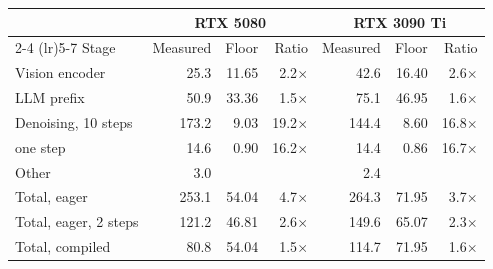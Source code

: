 \centering
\small
\begin{tabular}{lrrrrrr}
\toprule
 & \multicolumn{3}{c}{RTX 5080} & \multicolumn{3}{c}{RTX 3090 Ti} \\
\cmidrule(lr){2-4} \cmidrule(lr){5-7}
Stage & Measured & Floor & Ratio & Measured & Floor & Ratio \\
\midrule
Vision encoder          & 25.3  & 11.65 & 2.2$\times$  & 42.6 & 16.40 & 2.6$\times$ \\
LLM prefix              & 50.9  & 33.36 & 1.5$\times$  & 75.1 & 46.95 & 1.6$\times$ \\
Denoising, 10 steps     & 173.2 & 9.03  & 19.2$\times$ & 144.4 & 8.60  & 16.8$\times$ \\
\quad one step          & 14.6  & 0.90  & 16.2$\times$ & 14.4 & 0.86  & 16.7$\times$ \\
Other                   & 3.0   &       &              & 2.4 &       &    \\
\midrule
Total, eager            & 253.1 & 54.04 & 4.7$\times$  & 264.3 & 71.95 & 3.7$\times$ \\
Total, eager, 2 steps   & 121.2 & 46.81 & 2.6$\times$  & 149.6 & 65.07 & 2.3$\times$ \\
Total, compiled         & 80.8  & 54.04 & 1.5$\times$  & 114.7 & 71.95 & 1.6$\times$ \\
\bottomrule
\end{tabular}
